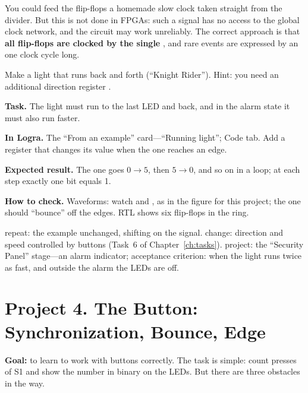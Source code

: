 \begin{infobox}
You could feed the flip-flops a homemade slow clock taken straight from
the divider. But this is not done in FPGAs: such a signal has no access to the
global clock network, and the circuit may work unreliably. The correct approach is that
\textbf{all flip-flops are clocked by the single }, and rare events
are expressed by an  one clock cycle long.
\end{infobox}

\begin{taskbox}
Make a light that runs back and forth (``Knight Rider''). Hint:
you need an additional direction register .
\end{taskbox}

\begin{diybox}
\textbf{Task.} The light must run to the last LED and back, and in the alarm state it must also run faster.

\textbf{In Logra.} The ``From an example'' card---``Running light''; Code tab. Add a register  that changes its value when the one reaches an edge.

\textbf{Expected result.} The one goes $0\to5$, then $5\to0$, and so on in a loop; at each step exactly one bit equals 1.

\textbf{How to check.} Waveforms: watch  and , as in the figure for this project; the one should ``bounce'' off the edges. RTL shows six flip-flops in the ring.

 repeat: the example unchanged, shifting on the  signal.  change: direction and speed controlled by buttons (Task~6 of Chapter~\ref{ch:tasks}).  project: the ``Security Panel'' stage---an alarm indicator; acceptance criterion: when  the light runs twice as fast, and outside the alarm the LEDs are off.
\end{diybox}

\section{Project 4. The Button: Synchronization, Bounce, Edge}

\textbf{Goal:} to learn to work with buttons correctly. The task is simple:
count presses of S1 and show the number in binary on the LEDs. But
there are three obstacles in the way.

